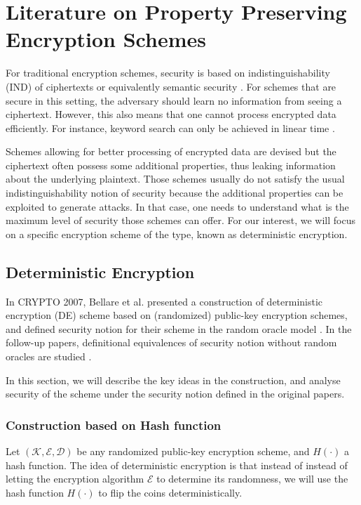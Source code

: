 \documentclass[10pt]{book}
\begin{document}
\chapter{Literature on Property Preserving Encryption Schemes}
For traditional encryption schemes, security is based on indistinguishability (IND) of ciphertexts \cite{GOLDWASSER1984270} or equivalently semantic security \cite{Goldwasser:1982:PEA:800070.802212}. For schemes that are secure in this setting, the adversary should learn no information from seeing a ciphertext. However, this also means that one cannot process encrypted data efficiently. For instance, keyword search can only be achieved in linear time \cite{Boneh2004, Song:2000:PTS:882494.884426}.

Schemes allowing for better processing of encrypted data are devised but the ciphertext often possess some additional properties, thus leaking information about the underlying plaintext. Those schemes usually do not satisfy the usual indistinguishability notion of security because the additional properties can be exploited to generate attacks. In that case, one needs to understand what is the maximum level of security those schemes can offer. For our interest, we will focus on a specific encryption scheme of the type, known as deterministic encryption.




\section{Deterministic Encryption}
In CRYPTO 2007, Bellare et al. presented a construction of deterministic encryption (DE) scheme based on (randomized) public-key encryption schemes, and defined security notion for their scheme in the random oracle model \cite{Bellare2007}. In the follow-up papers, definitional equivalences of security notion without random oracles are studied \cite{Bellare2008, Boldyreva2008}.

In this section, we will describe the key ideas in the construction, and analyse security of the scheme under the security notion defined in the original papers.


\subsection{Construction based on Hash function}
Let $(\mathcal{K}, \mathcal{E}, \mathcal{D})$ be any randomized public-key encryption scheme, and $H(\cdot)$ a hash function. The idea of deterministic encryption is that instead of instead of letting the encryption algorithm $\mathcal{E}$ to determine its randomness, we will use the hash function $H(\cdot)$ to flip the coins deterministically.
\end{document}
